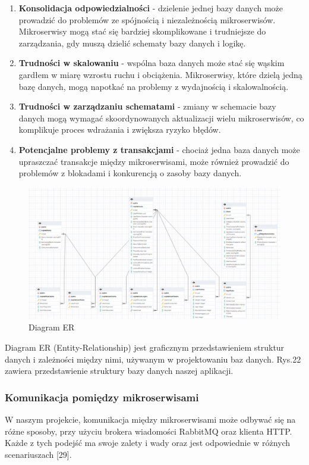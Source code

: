\begin{enumerate}
\item {\bf Konsolidacja odpowiedzialności} - dzielenie jednej bazy danych może prowadzić do problemów ze spójnością i niezależnością mikroserwisów. Mikroserwisy mogą stać się bardziej skomplikowane i trudniejsze do zarządzania, gdy muszą dzielić schematy bazy danych i logikę.
\item {\bf Trudności w skalowaniu} - wspólna baza danych może stać się wąskim gardłem w miarę wzrostu ruchu i obciążenia. Mikroserwisy, które dzielą jedną bazę danych, mogą napotkać na problemy z wydajnością i skalowalnością.
\item {\bf Trudności w zarządzaniu schematami} - zmiany w schemacie bazy danych mogą wymagać skoordynowanych aktualizacji wielu mikroserwisów, co komplikuje proces wdrażania i zwiększa ryzyko błędów.
\item {\bf Potencjalne problemy z transakcjami} - chociaż jedna baza danych może upraszczać transakcje między mikroserwisami, może również prowadzić do problemów z blokadami i konkurencją o zasoby bazy danych.
\end{enumerate}

\begin{figure}[H]
    \centering
    \includegraphics[width=1\linewidth]{Obrazy/erBazyDanych.png}
    \caption{Diagram ER}
    \label{fig:enter-label}
\end{figure}

Diagram ER (Entity-Relationship) jest graficznym przedstawieniem struktur danych i zależności między nimi, używanym w projektowaniu baz danych. Rys.22 zawiera przedstawienie struktury bazy danych naszej aplikacji.

\subsubsection{Komunikacja pomiędzy mikroserwisami}
W naszym projekcie, komunikacja między mikroserwisami może odbywać się na różne sposoby, przy użyciu brokera wiadomości RabbitMQ oraz klienta HTTP. Każde z tych podejść ma swoje zalety i wady oraz jest odpowiednie w różnych scenariuszach [29].


